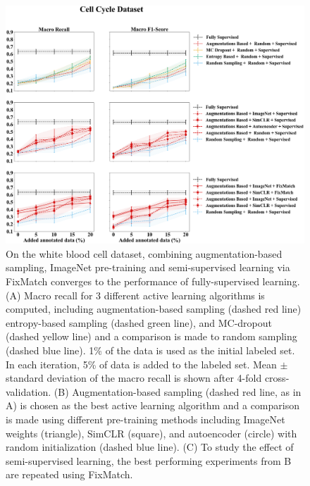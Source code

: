 \begin{figure}[htbp]
\centering
\captionsetup{format=plain}
\includegraphics[width=\textwidth]{figures/fig_2_cycle_recall_f1.png}
\caption{On the white blood cell dataset, combining augmentation-based sampling, ImageNet pre-training and semi-supervised learning via FixMatch converges to the performance of fully-supervised learning. (A) Macro recall for 3 different active learning algorithms is computed, including augmentation-based sampling (dashed red line) entropy-based sampling (dashed green line), and MC-dropout (dashed yellow line) and a comparison is made to random sampling (dashed blue line). 1\% of the data is used as the initial labeled set. In each iteration, 5\% of data is added to the labeled set. Mean $\pm$ standard deviation of the macro recall is shown after 4-fold cross-validation. (B) Augmentation-based sampling (dashed red line, as in A) is chosen as the best active learning algorithm and a comparison is made using different pre-training methods including ImageNet weights (triangle), SimCLR (square), and autoencoder (circle) with random initialization (dashed blue line). (C) To study the effect of semi-supervised learning, the best performing experiments from B are repeated using FixMatch.}
\label{fig:fig_2_cycle_recall_f1}
\end{figure}

